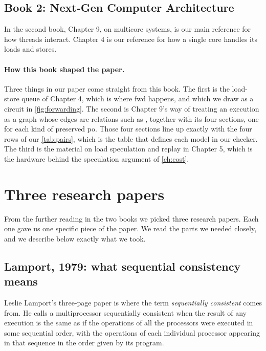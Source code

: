 \subsection{Book 2: Next-Gen Computer Architecture}

In the second book\cite{sarangiNextGen}, Chapter 9, on multicore systems, is our main reference for how threads interact. Chapter 4 is our reference for how a single core handles its loads and stores.

\paragraph{How this book shaped the paper.} Three things in our paper come straight from this book. The first is the load-store queue of Chapter 4, which is where \gls{fwd} happens, and which we draw as a circuit in \cref{fig:forwarding}. The second is Chapter 9's way of treating an execution as a graph whose edges are relations such as \rf, together with its four sections, one for each kind of preserved \gls{po}. Those four sections line up exactly with the four rows of our \cref{tab:pairs}, which is the table that defines each model in our checker. The third is the material on load speculation and replay in Chapter 5, which is the hardware behind the speculation argument of \cref{ch:cost}.

\section{Three research papers}
\label{sec:papers}

From the further reading in the two books we picked three research papers. Each one gave us one specific piece of the paper. We read the parts we needed closely, and we describe below exactly what we took.

\subsection{Lamport, 1979: what sequential consistency means}
\label{sec:lamport}

Leslie Lamport's three-page paper\cite{lamport1979how} is where the term \emph{sequentially consistent} comes from. He calls a multiprocessor sequentially consistent when the result of any execution is the same as if the operations of all the processors were executed in some sequential order, with the operations of each individual processor appearing in that sequence in the order given by its program.

